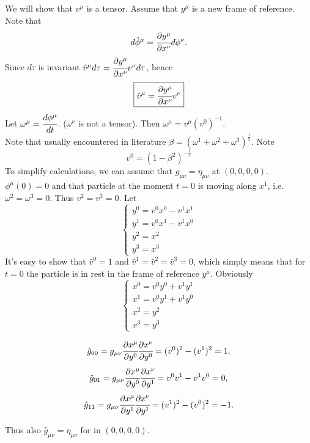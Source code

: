 \documentclass[main.tex]{subfiles}
\begin{document}
We will show that $v^\mu$ is a tensor.
Assume that $y^\mu$ is a new frame of reference. Note that
$$
d\hat{\phi}^\mu = \cfrac{\partial y^\mu}{\partial x^\nu} d\phi^\nu.
$$
Since $d\tau$ is invariant $\hat{v}^\mu d\tau = \cfrac{\partial y^\mu}{\partial x^\nu} v^\nu d\tau$, hence
$$
\boxed{
\hat{v}^\mu = \cfrac{\partial y^\mu}{\partial x^\nu} v^\nu
}
$$
Let $\omega^\mu = \cfrac{d\phi^\mu}{dt}$. ($\omega^\nu$ is not a tensor). Then $\omega^\mu = v^\mu(v^0)^{-1}$.\\
Note that usually encountered in literature $\beta = (\omega^1 + \omega^2 + \omega^3)^{\frac{1}{2}}$. Note
\begin{equation}
\boxed{
v^0 = (1 - \beta^2)^{-\frac{1}{2}}}
\end{equation} 
To simplify calculations, we can assume that $g_{\mu\nu} = \eta_{\mu\nu}$ at $(0,0,0,0)$. $\phi^\mu(0) = 0$ and that particle at the moment $t=0$ is moving along $x^1$, i.e. $\omega^2 = \omega^3 = 0$. Thus $v^2 = v^3 = 0$.
Let 
\begin{equation}\label{lo1}
\begin{cases}
y^0 = v^0x^0 - v^1x^1\\
y^1 = v^0x^1 - v^1x^0\\
y^2 = x^2\\
y^3 = x^3
\end{cases}
\end{equation}
It's easy to show that $\hat{v}^0 = 1$ and $\hat{v}^1 = \hat{v}^2 = \hat{v}^3 = 0$, which simply means that for $t = 0$ the particle is in rest in the frame of reference $y^\mu$.
Obviously
\begin{equation}\label{lo2}
\begin{cases}
x^0 = v^0y^0 + v^1y^1\\
x^1 = v^0y^1 + v^1y^0\\
x^2 = y^2\\
x^3 = y^3
\end{cases}
\end{equation}

$$
\hat{g}_{00} = g_{\mu\nu} \cfrac{\partial x^\mu}{\partial y^0}\cfrac{\partial x^\nu}{\partial y^0} = 
(v^0)^2 - (v^1)^2 = 1,
$$
$$
\hat{g}_{01} = g_{\mu\nu} \cfrac{\partial x^\mu}{\partial y^0}\cfrac{\partial x^\nu}{\partial y^1} = 
v^0v^1 - v^1v^0 = 0,
$$
$$
\hat{g}_{11} = g_{\mu\nu} \cfrac{\partial x^\mu}{\partial y^1}\cfrac{\partial x^\nu}{\partial y^1} = 
(v^1)^2 - (v^0)^2 = -1.
$$

Thus also $\hat{g}_{\mu\nu} = \eta_{\mu\nu}$ for in $(0,0,0,0)$.
\end{document}
